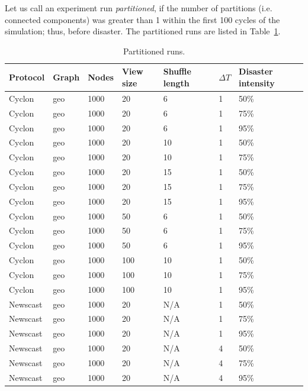 \documentclass[a4paper]{ifacconf}
\newcommand{\DT}{\ensuremath{{\Delta}T}}
\begin{document}
Let us call an experiment run \emph{partitioned}, if the number of partitions (i.e. connected components) was greater than 1 within the first 100 cycles of the simulation; thus, before disaster.
The partitioned runs are listed in Table~\ref{tab:partitioned}.

\begin{table}
    \centering\begin{tabular}{lllllll}
        Protocol & Graph & Nodes & View size & Shuffle length & \DT & Disaster intensity \\
        \hline
        Cyclon & geo & 1000 & 20 & 6 & 1 & 50\% \\
        Cyclon & geo & 1000 & 20 & 6 & 1 & 75\% \\
        Cyclon & geo & 1000 & 20 & 6 & 1 & 95\% \\
        Cyclon & geo & 1000 & 20 & 10 & 1 & 50\% \\
        Cyclon & geo & 1000 & 20 & 10 & 1 & 75\% \\
        Cyclon & geo & 1000 & 20 & 15 & 1 & 50\% \\
        Cyclon & geo & 1000 & 20 & 15 & 1 & 75\% \\
        Cyclon & geo & 1000 & 20 & 15 & 1 & 95\% \\
        Cyclon & geo & 1000 & 50 & 6 & 1 & 50\% \\
        Cyclon & geo & 1000 & 50 & 6 & 1 & 75\% \\
        Cyclon & geo & 1000 & 50 & 6 & 1 & 95\% \\
        Cyclon & geo & 1000 & 100 & 10 & 1 & 50\% \\
        Cyclon & geo & 1000 & 100 & 10 & 1 & 75\% \\
        Cyclon & geo & 1000 & 100 & 10 & 1 & 95\% \\
        Newscast & geo & 1000 & 20 & N/A & 1 & 50\% \\
        Newscast & geo & 1000 & 20 & N/A & 1 & 75\% \\
        Newscast & geo & 1000 & 20 & N/A & 1 & 95\% \\
        Newscast & geo & 1000 & 20 & N/A & 4 & 50\% \\
        Newscast & geo & 1000 & 20 & N/A & 4 & 75\% \\
        Newscast & geo & 1000 & 20 & N/A & 4 & 95\% \\
    \end{tabular}
    \caption{Partitioned runs.}
    \label{tab:partitioned}
\end{table}
\end{document}
